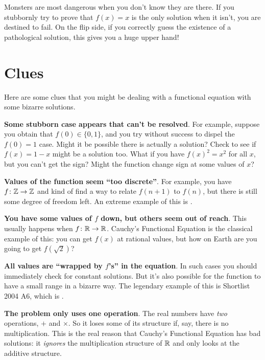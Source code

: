 \documentclass[11pt]{scrartcl}
\begin{document}
Monsters are most dangerous when you don't know they are there.
If you stubbornly try to prove that $f(x) = x$ is the only solution when it isn't,
you are destined to fail.
On the flip side, if you correctly guess the existence of a pathological solution,
this gives you a huge upper hand!

\section{Clues}
Here are some clues that you might be dealing with a
functional equation with some bizarre solutions.

\begin{itemize}
  \ii \textbf{Some stubborn case appears that can't be resolved}.
  For example, suppose you obtain that $f(0) \in \{0,1\}$,
  and you try without success to dispel the $f(0) = 1$ case.
  Might it be possible there is actually a solution?
  Check to see if $f(x) = 1-x$ might be a solution too.
  What if you have $f(x)^2 = x^2$ for all $x$, but you can't get the sign?
  Might the function change sign at some values of $x$?

  \ii \textbf{Values of the function seem ``too discrete''}.
  For example, you have $f \colon \mathbb Z \to \mathbb Z$ and kind of find a way to relate $f(n+1)$
  to $f(n)$, but there is still some degree of freedom left.
  An extreme example of this is .

  \ii \textbf{You have some values of $f$ down, but others seem out of reach}.
  This usually happens when $f \colon \mathbb R \to \mathbb R$.
  Cauchy's Functional Equation is the classical example of this:
  you can get $f(x)$ at rational values, but how on Earth are you going
  to get $f(\sqrt 2)$?

  \ii \textbf{All values are ``wrapped by $f$'s'' in the equation}.
  In such cases you should immediately check for constant solutions.
  But it's also possible for the function to have a small range
  in a bizarre way.
  The legendary example of this is Shortlist 2004 A6,
  which is .

  \ii \textbf{The problem only uses one operation}.
  The real numbers have \emph{two} operations, $+$ and $\times$.
  So it loses some of its structure if, say, there is no multiplication.
  This is the real reason that Cauchy's Functional Equation has bad solutions:
  it \emph{ignores} the multiplication structure of $\mathbb R$
  and only looks at the additive structure.
\end{itemize}
\end{document}
